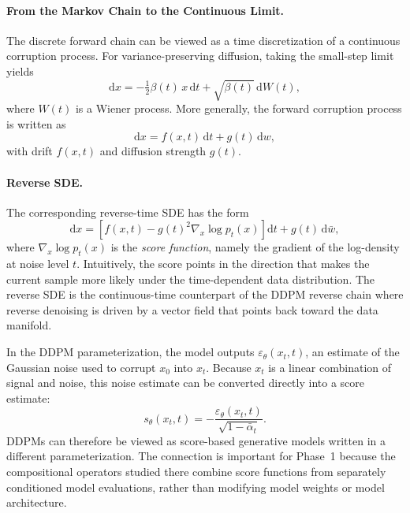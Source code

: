 \paragraph{From the Markov Chain to the Continuous Limit.}
The discrete forward chain can be viewed as a time discretization of a continuous corruption
process. For variance-preserving diffusion, taking the small-step limit yields
\begin{equation}
    \mathrm{d}x
    =
    -\tfrac{1}{2}\beta(t)\,x\,\mathrm{d}t
    +
    \sqrt{\beta(t)}\,\mathrm{d}W(t),
\end{equation}
where $W(t)$ is a Wiener process. More generally, the forward corruption process is written as
\begin{equation}
    \mathrm{d}x = f(x,t)\,\mathrm{d}t + g(t)\,\mathrm{d}w,
\end{equation}
with drift \(f(x,t)\) and diffusion strength \(g(t)\).

\paragraph{Reverse SDE.}
The corresponding reverse-time SDE has the form
\begin{equation}
    \mathrm{d}x
    =
    \left[
        f(x,t) - g(t)^2 \nabla_x \log p_t(x)
    \right]\mathrm{d}t
    +
    g(t)\,\mathrm{d}\bar w,
\end{equation}
where \(\nabla_x \log p_t(x)\) is the \emph{score function}, namely the gradient of the
log-density at noise level \(t\). Intuitively, the score points in the direction that makes
the current sample more likely under the time-dependent data distribution. The reverse SDE is
the continuous-time counterpart of the DDPM reverse chain where reverse denoising is driven by a vector field
that points back toward the data manifold.

In the DDPM parameterization, the model outputs \(\varepsilon_\theta(x_t,t)\), an estimate
of the Gaussian noise used to corrupt \(x_0\) into \(x_t\). Because \(x_t\) is a linear
combination of signal and noise, this noise estimate can be converted directly into a score
estimate:
\begin{equation}
    s_\theta(x_t, t) = -\frac{\varepsilon_\theta(x_t, t)}{\sqrt{1-\bar\alpha_t}}.
    \label{eq:score_noise}
\end{equation}
DDPMs can therefore be viewed as score-based generative models written in a different
parameterization. 
The connection is important for
Phase~1 because the compositional operators studied there combine score functions from
separately conditioned model evaluations, rather than modifying model weights or model
architecture.


